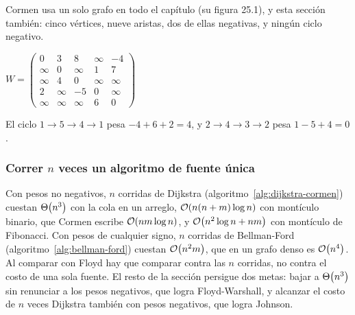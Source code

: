 \documentclass[11pt,letterpaper]{article}
\begin{document}
\begin{ejemplo}
  \label{ej:grafo-pares}
  Cormen usa un solo grafo en todo el capítulo (su figura 25.1), y
  esta sección también: cinco vértices, nueve aristas, dos de ellas
  negativas, y ningún ciclo negativo.
  \begin{center}
  \hspace{1.2cm}
  $W = \begin{pmatrix}
    0 & 3 & 8 & \infty & -4 \\
    \infty & 0 & \infty & 1 & 7 \\
    \infty & 4 & 0 & \infty & \infty \\
    2 & \infty & -5 & 0 & \infty \\
    \infty & \infty & \infty & 6 & 0
  \end{pmatrix}$
  \end{center}
  El ciclo $1 \to 5 \to 4 \to 1$ pesa $-4 + 6 + 2 = 4$, y
  $2 \to 4 \to 3 \to 2$ pesa $1 - 5 + 4 = 0$.
\end{ejemplo}

\subsubsection*{Correr $n$ veces un algoritmo de fuente única}

Con pesos no negativos, $n$ corridas de Dijkstra
(algoritmo~\ref{alg:dijkstra-cormen}) cuestan $\Theta\!\left(n^3\right)$ con la cola
en un arreglo, $\mathcal{O}\!\left(n(n + m)\log n\right)$ con montículo binario, que
Cormen escribe $\mathcal{O}\!\left(nm \log n\right)$, y $\mathcal{O}\!\left(n^2 \log n + nm\right)$ con
montículo de Fibonacci. Con pesos de cualquier signo, $n$ corridas de
Bellman-Ford (algoritmo~\ref{alg:bellman-ford}) cuestan
$\mathcal{O}\!\left(n^2 m\right)$, que en un grafo denso es $\mathcal{O}\!\left(n^4\right)$. Al comparar con
Floyd hay que comparar contra las $n$ corridas, no contra el costo de
una sola fuente. El resto de la sección persigue dos metas: bajar a
$\Theta\!\left(n^3\right)$ sin renunciar a los pesos negativos, que logra
Floyd-Warshall, y alcanzar el costo de $n$ veces Dijkstra también con
pesos negativos, que logra Johnson.
\end{document}
